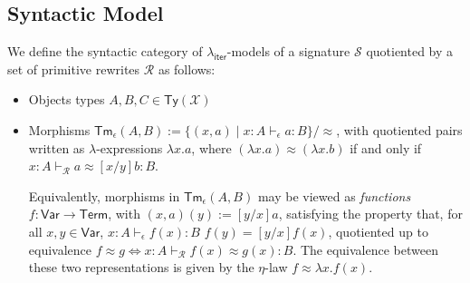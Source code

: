 \documentclass[acmsmall,screen,review]{acmart}
\newcommand{\mc}[1]{\ensuremath{\mathcal{#1}}}
\newcommand{\ms}[1]{\ensuremath{\mathsf{#1}}}
\newcommand{\hasty}[4]{#1 \vdash_{#2} #3: {#4}}
\newcommand{\teqv}{\approx}
\newcommand{\tmeq}[5]{#1 \vdash_{#2} #3 \teqv #4 : {#5}}
\newcommand{\subiterexp}{\texorpdfstring{\(\lambda_{\ms{iter}}\)}{lambda-iter}}
\begin{document}
\subsection{Syntactic Model}

\label{apx:syn-model}

We define the syntactic category of \subiterexp{}-models of a signature $\mc{S}$ quotiented by a set
of primitive rewrites $\mc{R}$ as follows:
\begin{itemize}
  \item Objects types $A, B, C \in \ms{Ty}(\mc{X})$
  \item Morphisms $\ms{Tm}_\epsilon(A, B) := \{(x, a) \mid \hasty{x : A}{\epsilon}{a}{B}\} /
  \approx$, with quotiented pairs written as $\lambda$-expressions $\lambda x . a$, where $(\lambda
  x . a) \approx (\lambda x . b)$ if and only if $\tmeq{x : A}{\mc{R}}{a}{[x/y]b}{B}$. 

  Equivalently, morphisms in $\ms{Tm}_\epsilon(A, B)$ may be viewed as \emph{functions} $f :
  \ms{Var} \to \ms{Term}$, with $(x, a)(y) := [y/x]a$, satisfying the property that, for all $x, y
  \in \ms{Var}$, $\hasty{x : A}{\epsilon}{f(x)}{B}$ $f(y) = [y/x]f(x)$, quotiented up to equivalence
  $f \approx g \iff \tmeq{x : A}{\mc{R}}{f(x)}{g(x)}{B}$. The equivalence between these two
  representations is given by the $\eta$-law $f \approx \lambda x. f(x)$.


\end{itemize}
\end{document}
